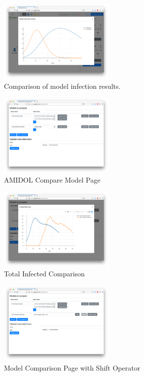 \documentclass[12pt]{galois-whitepaper}
\begin{document}
\begin{figure}
  \centering
  \includegraphics[width=0.5\textwidth]{figs/comparision-ui-2.png}
  \caption{Comparison of model infection results.}
  \label{Fig:Comparison2}
\end{figure}

\begin{figure}
  \centering
  \includegraphics[width=0.5\textwidth]{figs/comparision-ui-3.png}
  \caption{AMIDOL Compare Model Page}
  \label{Fig:Comparison3}
\end{figure}

\begin{figure}
  \centering
  \includegraphics[width=0.5\textwidth]{figs/comparision-ui-4.png}
  \caption{Total Infected Comparison}
  \label{Fig:Comparison4}
\end{figure}

\begin{figure}
  \centering
  \includegraphics[width=0.5\textwidth]{figs/comparision-ui-5.png}
  \caption{Model Comparison Page with Shift Operator}
  \label{Fig:Comparison5}
\end{figure}
\end{document}
